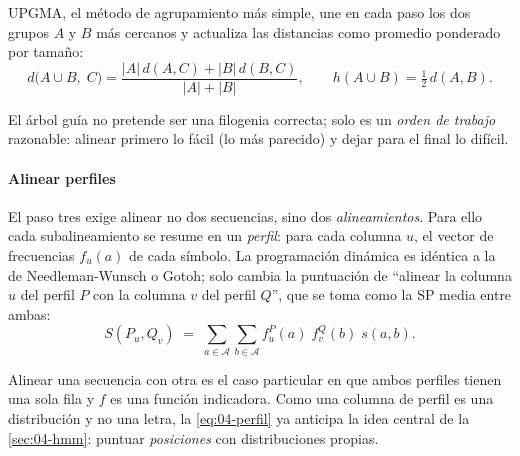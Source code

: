 UPGMA, el método de agrupamiento más simple, une en cada paso los dos grupos $A$ y $B$ más cercanos y actualiza las distancias como promedio ponderado por tamaño:
\begin{equation}\label{eq:04-upgma}
d\big(A\cup B,\;C\big) = \frac{|A|\,d(A,C) + |B|\,d(B,C)}{|A|+|B|},\qquad h(A\cup B)=\tfrac12\,d(A,B).
\end{equation}

\begin{simbolos}
\end{simbolos}

\noindent El árbol guía no pretende ser una filogenia correcta; solo es un \emph{orden de trabajo} razonable: alinear primero lo fácil (lo más parecido) y dejar para el final lo difícil.

\paragraph{Alinear perfiles} El paso tres exige alinear no dos secuencias, sino dos \emph{alineamientos}. Para ello cada subalineamiento se resume en un \emph{perfil}: para cada columna $u$, el vector de frecuencias $f_u(a)$ de cada símbolo. La programación dinámica es idéntica a la de Needleman-Wunsch o Gotoh; solo cambia la puntuación de ``alinear la columna $u$ del perfil $P$ con la columna $v$ del perfil $Q$'', que se toma como la SP media entre ambas:
\begin{equation}\label{eq:04-perfil}
S(P_u, Q_v) \;=\; \sum_{a\in\mathcal{A}}\sum_{b\in\mathcal{A}} f^{P}_u(a)\;f^{Q}_v(b)\;s(a,b).
\end{equation}

\begin{simbolos}
\end{simbolos}

\noindent Alinear una secuencia con otra es el caso particular en que ambos perfiles tienen una sola fila y $f$ es una función indicadora. Como una columna de perfil es una distribución y no una letra, la \cref{eq:04-perfil} ya anticipa la idea central de la \cref{sec:04-hmm}: puntuar \emph{posiciones} con distribuciones propias.

